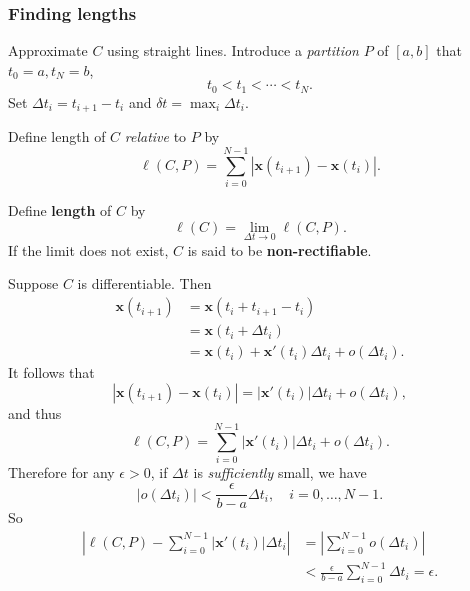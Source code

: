 \subsubsection*{Finding lengths}

Approximate $C$ using straight lines. Introduce a \textit{partition} $P$ of $[a,b]$ that $ t_0 = a, t_N = b $,
\[
    t_0<t_1<\cdots<t_N.
\]
Set $ \Delta t_i = t_{i+1}-t_i $ and $ \delta t = \max_i \Delta t_i $.
\begin{definition}
    Define length of $C$ \textit{relative} to $P$ by
    \[
        \ell (C,P) = \sum_{i=0}^{N-1} \left| \mathbf{x}(t_{i+1})-\mathbf{x}(t_i) \right|.
    \]
\end{definition}

\begin{center}
\end{center}

\begin{definition}
    Define \textbf{length} of $C$ by
    \[
        \ell (C) = \lim_{\Delta t \to 0} \ell (C,P).
    \]
    If the limit does not exist, $C$ is said to be \textbf{non-rectifiable}.
\end{definition}

Suppose $C$ is differentiable. Then
\begin{align*}
    \mathbf{x}(t_{i+1}) & = \mathbf{x}(t_i+t_{i+1}-t_i)                                   \\
                        & = \mathbf{x}(t_i+ \Delta t_i)                                   \\
                        & = \mathbf{x}(t_i) + \mathbf{x}'(t_i)\Delta t_i + o(\Delta t_i).
\end{align*}
It follows that
\[
    \left| \mathbf{x}(t_{i+1})- \mathbf{x}(t_i)\right| =\left| \mathbf{x}'(t_i) \right| \Delta t_i + o(\Delta t_i),
\]
and thus 
\[
    \ell (C,P) = \sum_{i=0}^{N-1} \left| \mathbf{x}'(t_i) \right| \Delta t_i + o(\Delta t_i).
\]
Therefore for any $ \epsilon>0 $, if $ \Delta t $ is \textit{sufficiently} small, we have 
\[
    \left| o(\Delta t_i) \right| < \frac{\epsilon }{b-a} \Delta t_i, \quad i=0,\dots,N-1.
\]
So 
\begin{align*}
    \left| \ell (C,P) - \sum_{i=0}^{N-1} \left| \mathbf{x}'(t_i) \right| \Delta t_i \right| &= \left| \sum_{i=0}^{N-1} o(\Delta t_i) \right| \\ 
    &< \frac{\epsilon}{b-a} \sum_{i=0}^{N-1} \Delta t_i = \epsilon.
\end{align*}


